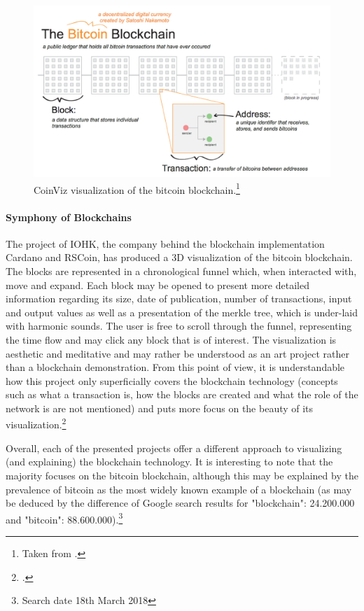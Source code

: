 \begin{figure}
    \centering
    \includegraphics[width=\linewidth]{latex-vorlage_v1.5/graphics/CoinViz.png}
    \caption[CoinViz visualization of the bitcoin blockchain.]{CoinViz visualization of the bitcoin blockchain.\footnote{Taken from \cite{GiudiciCoinViz2016}.}}
    \label{fig:CoinViz}
\end{figure}

\paragraph{Symphony of Blockchains} The project of IOHK, the company behind the blockchain implementation Cardano and RSCoin, has produced a 3D visualization of the bitcoin blockchain. The blocks are represented in a chronological funnel which, when interacted with, move and expand. Each block may be opened to present more detailed information regarding its size, date of publication, number of transactions, input and output values as well as a presentation of the merkle tree, which is under-laid with harmonic sounds. The user is free to scroll through the funnel, representing the time flow and may click any block that is of interest. The visualization is aesthetic and meditative and may rather be understood as an art project rather than a blockchain demonstration. From this point of view, it is understandable how this project only superficially covers the blockchain technology (concepts such as what a transaction is, how the blocks are created and what the role of the network is are not mentioned) and puts more focus on the beauty of its visualization.\footcite[Cf.][]{IOHKSymphonyBlockchains2018} 

Overall, each of the presented projects offer a different approach to visualizing (and explaining) the blockchain technology. It is interesting to note that the majority focuses on the bitcoin blockchain, although this may be explained by the prevalence of bitcoin as the most widely known example of a blockchain (as may be deduced by the difference of Google search results for "blockchain": 24.200.000 and "bitcoin": 88.600.000).\footnote{Search date 18th March 2018}

